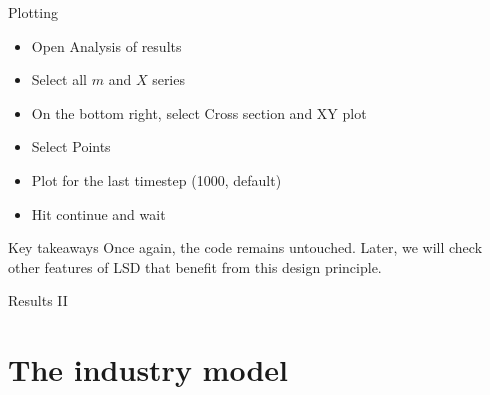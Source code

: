 \documentclass[bigger,aspectratio=169]{beamer}
\begin{document}
\begin{frame}[label={sec:orgb011e93}]{Plotting}
\begin{itemize}
\item Open Analysis of results
\item Select all \(m\) and \(X\) series
\item On the bottom right, select \alert{Cross section} and \alert{XY plot}
\item Select \alert{Points}
\item Plot for the last timestep (1000, default)
\item Hit continue and wait
\end{itemize}
\begin{block}{Key takeaways}
Once again, the code remains \alert{untouched}.
Later, we will check other features of LSD that benefit from this design principle.
\end{block}
\end{frame}
\begin{frame}[label={sec:orga33522e}]{Results II}
\begin{center}

\end{center}
\end{frame}
\section{The industry model}
\label{sec:org33815db}
\end{document}
